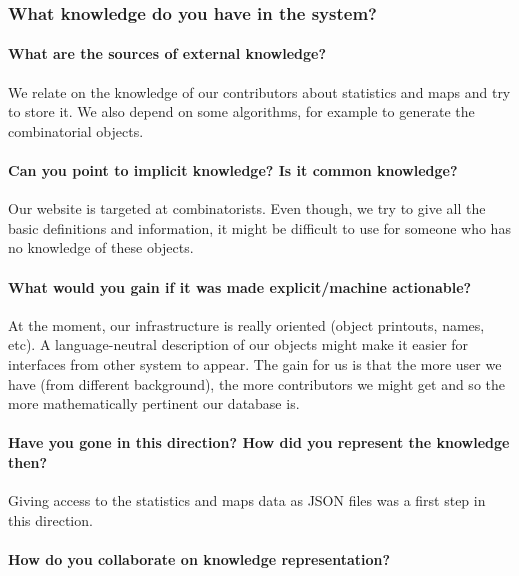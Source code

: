 \subsubsection{What knowledge do you have in the system?}
\paragraph{ What are the sources of external knowledge?}

We relate on the knowledge of our contributors about statistics and maps and try to store it. We also depend on some \SageMath algorithms, for example to generate the combinatorial
objects.

 \paragraph{Can you point to implicit knowledge? Is it common knowledge?}

Our website is targeted at combinatorists. Even though, we try to give all the basic definitions and information, it might be difficult to use for someone who has no
knowledge of these objects.

 \paragraph{What would you gain if it was made explicit/machine actionable?}

At the moment, our infrastructure is really \SageMath oriented (object printouts, names, etc). A language-neutral description of our objects might make it easier for interfaces
from other system to appear. The gain for us is that the more user we have (from different background), the more contributors we might get and so the more mathematically
pertinent our database is.

 \paragraph{Have you gone in this direction? How did you represent the knowledge then?}

Giving access to the statistics and maps data as JSON files was a first step in this direction.

 \paragraph{How do you collaborate on knowledge representation?}

